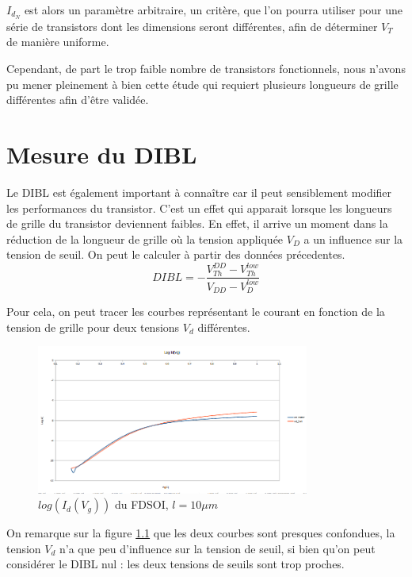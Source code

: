\documentclass[a4paper,11pt]{report}
\begin{document}
$I_{d_{N}}$ est alors un paramètre arbitraire, un critère, que l'on pourra utiliser pour une série de transistors dont les dimensions seront différentes, afin de déterminer $V_T$ de manière uniforme.

Cependant, de part le trop faible nombre de transistors fonctionnels, nous n'avons pu mener pleinement à bien cette étude qui requiert plusieurs longueurs de grille différentes afin d'être validée.

\chapter{Mesure du DIBL}
Le DIBL est également important à connaître car il peut sensiblement modifier les performances du transistor. C'est un effet qui apparait lorsque les  longueurs de grille du transistor deviennent faibles. En effet, il arrive un moment dans la réduction de la longueur de grille où la tension appliquée $V_D$ a un influence sur la tension de seuil. 
On peut le calculer à partir des données précedentes.
\[ DIBL = -\frac{V^{DD}_{Th} - V^{low}_{Th}}{V_{DD} - V^{low}_{D}}
\]

Pour cela, on peut tracer les courbes représentant le courant en fonction de la tension de grille pour deux tensions $V_d$ différentes.

\begin{figure}[h]
    \begin{center}
        \includegraphics[width=0.8\textwidth]{Images/logidvg10um}
        \caption{$log(I_d(V_g))$ du FDSOI, $l = 10\mu m$}
        \label{logidvg_fdsoi_10um}
    \end{center}
\end{figure}

On remarque sur la figure \ref{logidvg_fdsoi_10um} que les deux courbes sont presques confondues, la tension $V_d$ n'a que peu d'influence sur la tension de seuil, si bien qu'on peut considérer le DIBL nul : les deux tensions de seuils sont trop proches.
\end{document}
